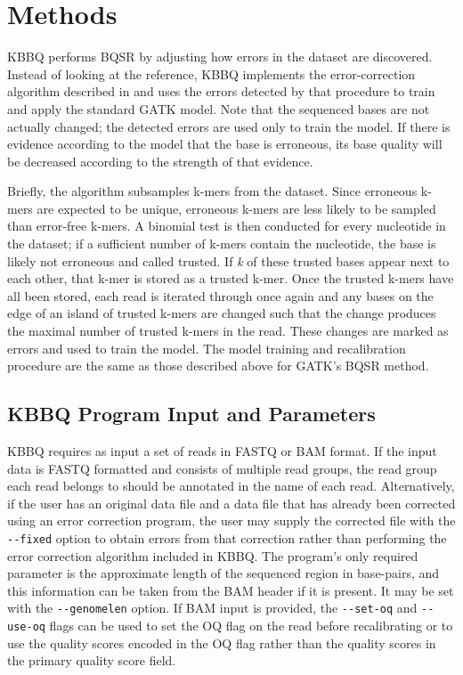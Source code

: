 \section{Methods}
KBBQ performs BQSR by adjusting how errors in the dataset are discovered.
Instead of looking at the reference, KBBQ implements the error-correction algorithm described in \cite{song_lighter_2014} and uses the errors detected by that procedure to train and apply the standard GATK model. Note that the sequenced bases are not actually changed; the detected errors are used only to train the model. If there is evidence according to the model that the base is erroneous, its base quality will be decreased according to the strength of that evidence.

Briefly, the algorithm subsamples k-mers from the dataset. Since erroneous k-mers are expected to be unique, erroneous k-mers are less likely to be sampled than error-free k-mers. A binomial test is then conducted for every nucleotide in the dataset; if a sufficient number of k-mers contain the nucleotide, the base is likely not erroneous and called trusted. If \textit{k} of these trusted bases appear next to each other, that k-mer is stored as a trusted k-mer. Once the trusted k-mers have all been stored, each read is iterated through once again and any bases on the edge of an island of trusted k-mers are changed such that the change produces the maximal number of trusted k-mers in the read. These changes are marked as errors and used to train the model.
The model training and recalibration procedure are the same as those described above for GATK's BQSR method.

\subsection{KBBQ Program Input and Parameters}

KBBQ requires as input a set of reads in FASTQ \parencite{cock_sanger_2010} or BAM \parencite{li_sequence_2009} format. If the input data is FASTQ formatted and consists of multiple read groups, the read group each read belongs to should be annotated in the name of each read. Alternatively, if the user has an original data file and a data file that has already been corrected using an error correction program, the user may supply the corrected file with the \texttt{-\phantom{}-fixed} option to obtain errors from that correction rather than performing the error correction algorithm included in KBBQ. The program's only required parameter is the approximate length of the sequenced region in base-pairs, and this information can be taken from the BAM header if it is present. It may be set with the \texttt{-\phantom{}-genomelen} option. If BAM input is provided, the \texttt{-\phantom{}-set-oq} and \texttt{-\phantom{}-use-oq} flags can be used to set the OQ flag on the read before recalibrating or to use the quality scores encoded in the OQ flag rather than the quality scores in the primary quality score field.

